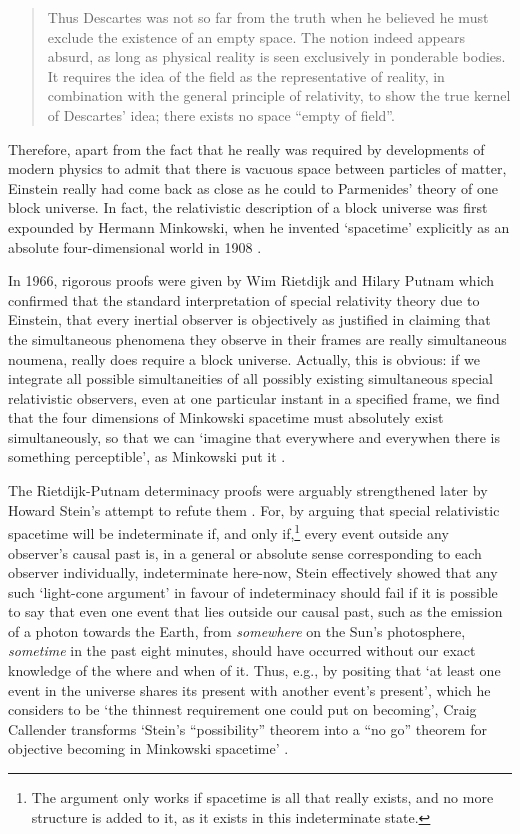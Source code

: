 \begin{quotation}
Thus Descartes was not so far from the truth when he believed he must exclude the existence of an empty space. The notion indeed appears absurd, as long as physical reality is seen exclusively in ponderable bodies. It requires the idea of the field as the representative of reality, in combination with the general principle of relativity, to show the true kernel of Descartes' idea; there exists no space ``empty of field''.
\end{quotation}

Therefore, apart from the fact that he really was required by developments of modern physics to admit that there is vacuous space between particles of matter, Einstein really had come back as close as he could to Parmenides' theory of one block universe. In fact, the relativistic description of a block universe was first expounded by Hermann Minkowski, when he invented `spacetime' explicitly as an absolute four-dimensional world in 1908 \cite{Einstein1952}. 

In 1966, rigorous proofs were given by Wim Rietdijk \cite{Rietdijk1966} and Hilary Putnam \cite{Putnam1967} which confirmed that the standard interpretation of special relativity theory due to Einstein, that every inertial observer is objectively as justified in claiming that the simultaneous phenomena they observe in their frames are really simultaneous noumena, really does require a block universe. Actually, this is obvious: if we integrate all possible simultaneities of all possibly existing simultaneous special relativistic observers, even at one particular instant in a specified frame, we find that the four dimensions of Minkowski spacetime must absolutely exist simultaneously, so that we can `imagine that everywhere and everywhen there is something perceptible', as Minkowski put it \cite{Einstein1952}.

The Rietdijk-Putnam determinacy proofs were arguably strengthened later by Howard Stein's \cite{Stein1968,Stein1991} attempt to refute them \cite{Callender2000,Savitt2008}. For, by arguing that special relativistic spacetime will be indeterminate if, and only if,\footnote{The argument only works if spacetime is all that really exists, and no more structure is added to it, as it exists in this indeterminate state.} every event outside any observer's causal past is, in a general or absolute sense corresponding to each observer individually, indeterminate here-now, Stein effectively showed that any such `light-cone argument' in favour of indeterminacy should fail if it is possible to say that even one event that lies outside our causal past, such as the emission of a photon towards the Earth, from \textit{somewhere} on the Sun's photosphere, \textit{sometime} in the past eight minutes, should have occurred without our exact knowledge of the where and when of it. Thus, e.g., by positing that `at least one event in the universe shares its present with another event's present', which he considers to be `the thinnest requirement one could put on becoming', Craig Callender transforms `Stein's ``possibility'' theorem into a ``no go'' theorem for objective becoming in Minkowski spacetime' \cite{Callender2000}.

